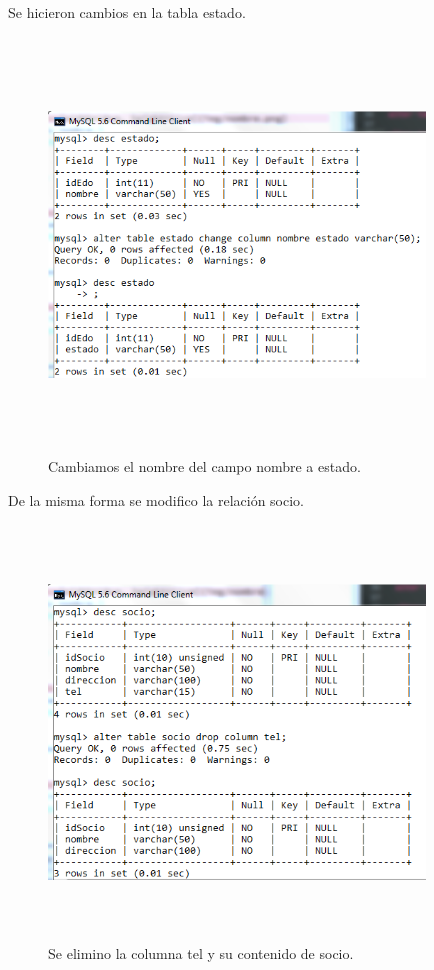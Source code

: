 \documentclass[12pt, titlepage]{article}
\begin{document}
Se hicieron cambios en la tabla estado.
\begin{figure}[H]
    \begin{center}
        \includegraphics[width=10cm, height=11cm]{img/change.png}
        \caption{Cambiamos el nombre del campo nombre a estado.}
        \label{fig:arlter90}
    \end{center}
\end{figure}
De la misma forma se modifico la relación socio.
\begin{figure}[H]
    \begin{center}
        \includegraphics[width=10cm, height=11cm]{img/socio.png}
        \caption{Se elimino la columna tel y su contenido de socio.}
        \label{fig:arlter777}
    \end{center}
\end{figure}
\end{document}
